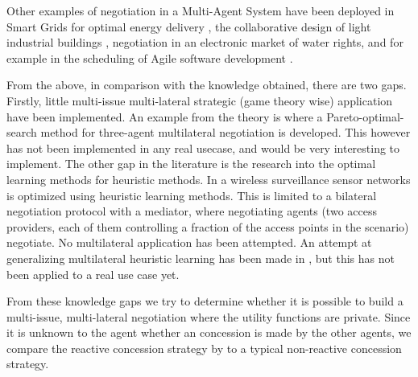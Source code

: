 Other examples of negotiation in a Multi-Agent System have been deployed in Smart Grids for optimal energy delivery \citep{pipattanasomporn2009multi}, the collaborative design of light industrial buildings \citep{anumba2003negotiation}, negotiation in an electronic market of water rights, and for example in the scheduling of Agile software development \citep{rabelo1999multi}.

From the above, in comparison with the knowledge obtained, there are two gaps. Firstly, little multi-issue multi-lateral strategic (game theory wise) application have been implemented. An example from the theory is \citet{wu2009efficient} where a Pareto-optimal-search method for three-agent multilateral negotiation is developed. This however has not been implemented in any real usecase, and would be very interesting to implement. The other gap in the literature is the research into the optimal learning methods for heuristic methods. In \citet{de2015automated} a wireless surveillance sensor networks is optimized using heuristic learning methods. This is limited to a bilateral negotiation protocol with a mediator, where negotiating agents (two access providers, each of them controlling a fraction of the access points in the scenario) negotiate. No multilateral application has been attempted. An attempt at generalizing multilateral heuristic learning has been made in \citet{beheshti2014homan}, but this has not been applied to a real use case yet. 

From these knowledge gaps we try to determine whether it is possible to build a multi-issue, multi-lateral negotiation where the utility functions are private. Since it is unknown to the agent whether an concession is made by the other agents, we compare the reactive concession strategy by \citet{zheng2015automated} to a typical non-reactive concession strategy.

